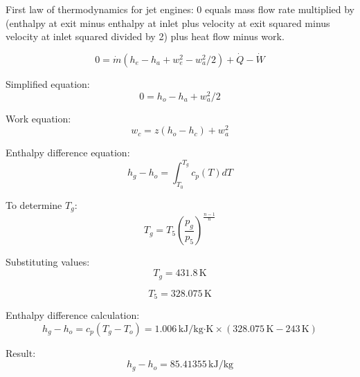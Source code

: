 First law of thermodynamics for jet engines:  
0 equals mass flow rate multiplied by (enthalpy at exit minus enthalpy at inlet plus velocity at exit squared minus velocity at inlet squared divided by 2) plus heat flow minus work.  

\[ 0 = \dot{m} (h_e - h_a + w_e^2 - w_a^2 / 2) + \dot{Q} - \dot{W} \]  

Simplified equation:  
\[ 0 = h_o - h_a + w_a^2 / 2 \]  

Work equation:  
\[ w_c = z (h_o - h_c) + w_a^2 \]  

Enthalpy difference equation:  
\[ h_g - h_o = \int_{T_0}^{T_g} c_p(T) dT \]  

To determine \( T_g \):  
\[ T_g = T_5 \left( \frac{p_g}{p_5} \right)^{\frac{n-1}{n}} \]  

Substituting values:  
\[ T_g = 431.8 \, \text{K} \]  

\[ T_5 = 328.075 \, \text{K} \]  

Enthalpy difference calculation:  
\[ h_g - h_o = c_p (T_g - T_o) = 1.006 \, \text{kJ/kg·K} \times (328.075 \, \text{K} - 243 \, \text{K}) \]  

Result:  
\[ h_g - h_o = 85.41355 \, \text{kJ/kg} \]
